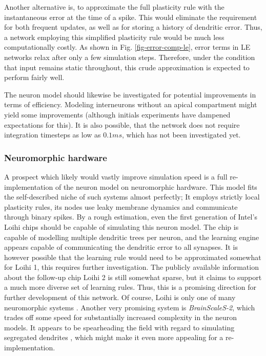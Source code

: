 Another alternative is, to approximate the full plasticity rule with the instantaneous error at the time of a spike.
This would eliminate the requirement for both frequent updates, as well as for storing a history of dendritic error.
Thus, a network employing this simplified plasticity rule would be much less computationally costly. As shown in Fig.
\ref{fig-error-comp-le}, error terms in LE networks relax after only a few simulation steps. Therefore, under the
condition that input remains static throughout, this crude approximation is expected to perform fairly well. \newline

\noindent The neuron model should likewise be investigated for potential improvements in terms of efficiency. Modeling
interneurons without an apical compartment might yield some improvements (although initials experiments have dampened
expectations for this). It is also possible, that the network does not require integration timesteps as low as $0.1ms$,
which has not been investigated yet. \newline

\subsubsection*{Neuromorphic hardware}

A prospect which likely would vastly improve simulation speed is a full re-implementation of the neuron model on
neuromorphic hardware. This model fits the self-described niche of such systems almost perfectly; It employs strictly
local plasticity rules, its nodes use leaky membrane dynamics and communicate through binary spikes. By a rough
estimation, even the first generation of Intel's Loihi chips \citep{davies2018loihi} should be capable of simulating
this neuron model. The chip is capable of modelling multiple dendritic trees per neuron, and the learning engine appears
capable of communicating the dendritic error to all synapses. It is however possible that the learning rule would need
to be approximated somewhat for Loihi 1, this requires further investigation. The publicly available information about
the follow-up chip Loihi 2 \citep{Davies2021} is still somewhat sparse, but it claims to support a much more diverse set
of learning rules. Thus, this is a promising direction for further development of this network. Of course, Loihi is only
one of many neuromorphic systems \citep{rajendran2019low}. Another very promising system is \textit{BrainScaleS-2}, 
which trades off some speed for substantially increased complexity in the neuron models. It appears to be spearheading
the field with regard to simulating segregated dendrites \citep{Kaiser2022}, which might make it even more appealing
for a re-implementation.

